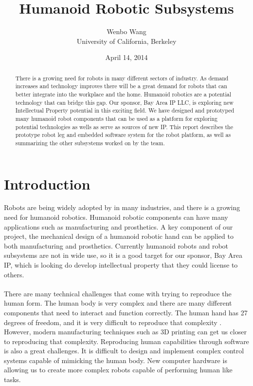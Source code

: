 \documentclass[titlepage,letterpaper,12pt]{article}
\title{Humanoid Robotic Subsystems}
\date{April 14, 2014}
\author{Wenbo Wang \\University of California, Berkeley}
\begin{document}


\begin{abstract}
There is a growing need for robots in many different sectors of industry. As
demand increases and technology improves there will be a great demand for robots
that can better integrate into the workplace and the home. Humanoid robotics are
a potential technology that can bridge this gap. Our sponsor, Bay Area IP LLC,
is exploring new Intellectual Property potential in this exciting field. We have
designed and prototyped many humanoid robot components that can be used as a
platform for exploring potential technologies as wells as serve as sources of
new IP. This report describes the prototype robot leg and embedded software
system for the robot platform, as well as summarizing the other subsystems
worked on by the team.
\end{abstract}

\tableofcontents
\clearpage

\section{Introduction}
\paragraph{}Robots are being widely adopted by in many industries, and there is
a growing need for humanoid robotics. Humanoid robotic components can have many
applications such as manufacturing and prosthetics. A key component of our
project, the mechanical design of a humanoid robotic hand can be applied to both
manufacturing and prosthetics. Currently humanoid robots and robot subsystems
are not in wide use, so it is a good target for our sponsor, Bay Area IP, which
is looking do develop intellectual property that they could license to others.

\paragraph{}There are many technical challenges that come with trying to
reproduce the human form. The human body is very complex and there are many
different components that need to interact and function correctly. The human
hand has 27 degrees of freedom, and it is very difficult to reproduce that
complexity \cite{ElKoura2003}. However, modern manufacturing techniques such as
3D printing can get us closer to reproducing that complexity. Reproducing human
capabilities through software is also a great challenges. It is difficult to
design and implement complex control systems capable of mimicking the human
body. New computer hardware is allowing us to create more complex robots capable
of performing human like tasks.
\end{document}
